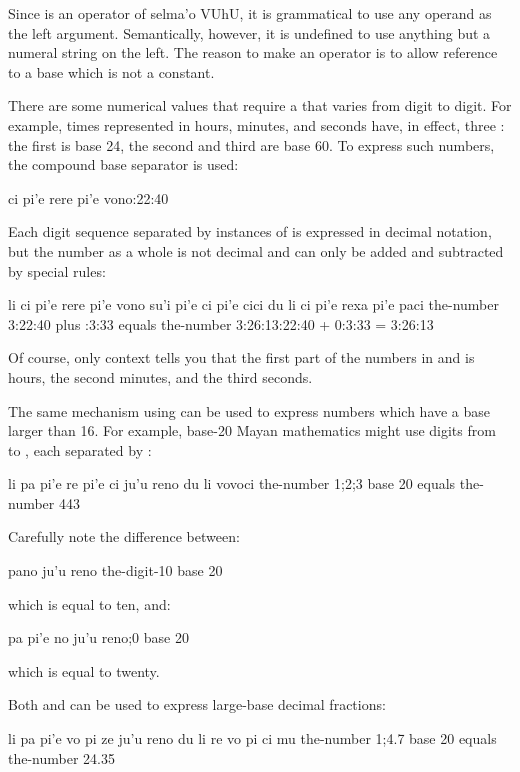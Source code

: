Since  is an operator of selma'o VUhU, it is
    grammatical to use any operand as the left argument.
    Semantically, however, it is undefined to use anything but a
    numeral string on the left. The reason to make  an
    operator is to allow reference to a base which is not a
    constant. 

There are some numerical values that require a  that
    varies from digit to digit. For example, times represented in
    hours, minutes, and seconds have, in effect, three :
    the first is base 24, the second and third are base 60. To
    express such numbers, the compound base separator  is
    used:
\begin{example}
ci pi'e rere pi'e vono:22:40
\end{example}

Each digit sequence separated by instances of  is
    expressed in decimal notation, but the number as a whole is not
    decimal and can only be added and subtracted by special rules:
\begin{example}
li ci pi'e rere pi'e vono su'i pi'e ci pi'e cici\n
\T	du li ci pi'e rexa pi'e paci\n
the-number 3:22:40 plus :3:33 equals the-number 3:26:13:22:40 + 0:3:33 = 3:26:13
\end{example}

Of course, only context tells you that the first part of the
    numbers in  and  is hours, the second minutes,
    and the third seconds.

The same mechanism using  can be used to express
    numbers which have a base larger than 16. For example, base-20
    Mayan mathematics might use digits from  to ,
    each separated by :
\begin{example}
li pa pi'e re pi'e ci ju'u reno du li vovoci\n
the-number 1;2;3 base 20 equals the-number 443
\end{example}

Carefully note the difference between:
\begin{example}
pano ju'u reno\n
the-digit-10 base 20
\end{example}

{\noindent}which is equal to ten, and:
\begin{example}
pa pi'e no ju'u reno;0 base 20
\end{example}

{\noindent}which is equal to twenty. 

Both  and  can be used to express large-base
    decimal fractions:
\begin{example}
li pa pi'e vo pi ze ju'u reno du li re vo pi ci mu\n
the-number 1;4.7 base 20 equals the-number 24.35
\end{example}

